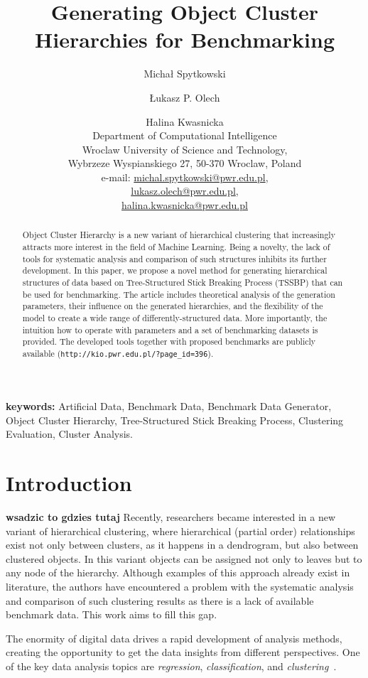 \documentclass{article}
\title{Generating Object Cluster Hierarchies for Benchmarking}
\author{Micha\l{} Spytkowski \and \L{}ukasz P. Olech \and Halina Kwasnicka \\ Department of Computational Intelligence\\ Wroclaw University of Science and Technology, \\ Wybrzeze Wyspianskiego 27, 50-370 Wroclaw, Poland\\ e-mail: \url{michal.spytkowski@pwr.edu.pl}, \\ \url{lukasz.olech@pwr.edu.pl}, \\ \url{halina.kwasnicka@pwr.edu.pl}}
\begin{document}
\maketitle

\begin{abstract}
	Object Cluster Hierarchy is a new variant of hierarchical clustering that increasingly attracts more interest in the field of Machine Learning. Being a novelty, the lack of tools for systematic analysis and comparison of such structures inhibits its further development. In this paper, we propose a novel method for generating hierarchical structures of data based on Tree-Structured Stick Breaking Process (TSSBP) that can be used for benchmarking. The article includes theoretical analysis of the generation parameters, their influence on the generated hierarchies, and the flexibility of the model to create a wide range of differently-structured data. More importantly, the intuition how to operate with parameters and a set of benchmarking datasets is provided. The developed tools together with proposed benchmarks are publicly available (\texttt{http://kio.pwr.edu.pl/?page\_id=396}).
\end{abstract}

\textbf{keywords:} Artificial Data, Benchmark Data, Benchmark Data Generator, Object Cluster Hierarchy, Tree-Structured Stick Breaking Process, Clustering Evaluation, Cluster Analysis.

\section{Introduction}

\textbf{wsadzic to gdzies tutaj}
Recently, researchers became interested in a new variant of hierarchical clustering, where hierarchical (partial order) relationships exist not only between clusters, as it happens in a dendrogram, but also between clustered objects. In this variant objects can be assigned not only to leaves but to any node of the hierarchy. Although examples of this approach already exist in literature, the authors have encountered a problem with the systematic analysis and comparison of such clustering results as there is a lack of available benchmark data. This work aims to fill this gap. 


The enormity of digital data drives a rapid development of analysis methods, creating the opportunity to get the data insights from different perspectives. One of the key data analysis topics are \textit{regression}, \textit{classification}, and \textit{clustering}~\cite{Kakkar2014,Dash2003109,Xu:2005:SCA:2325810.2327433}.
\end{document}
